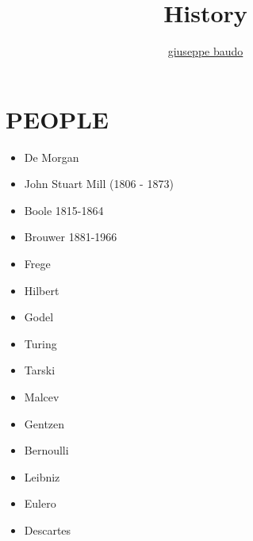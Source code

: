 \documentclass[a4paper,10pt]{article}
\title{History}
\author{\href{http://www.baudo.hol.es}{giuseppe baudo}}
\begin{document}
\maketitle

\section{PEOPLE}
\begin{itemize}
 \item De Morgan
 \item John Stuart Mill (1806 - 1873)
 \item Boole 1815-1864
 \item Brouwer 1881-1966
 \item Frege
 \item Hilbert
 \item Godel
 \item Turing
 \item Tarski
 \item Malcev
 \item Gentzen
 \item Bernoulli
 \item Leibniz
 \item Eulero
 \item Descartes
\end{itemize}

%
\end{document}
